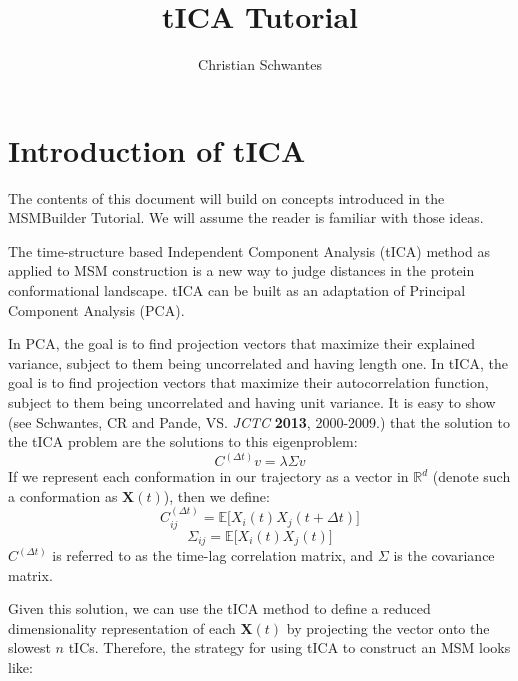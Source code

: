 \documentclass[12pt]{article}
\title
{tICA Tutorial}
\author{Christian Schwantes}
\begin{document}
\maketitle

\tableofcontents

\newpage
\section{Introduction of tICA}

The contents of this document will build on concepts introduced in the MSMBuilder Tutorial. We will assume the reader is familiar with those ideas.

The time-structure based Independent Component Analysis (tICA) method as applied to MSM construction is a new way to judge distances in the protein conformational landscape. tICA can be built as an adaptation of Principal Component Analysis (PCA).

In PCA, the goal is to find projection vectors that maximize their explained variance, subject to them being uncorrelated and having length one. In tICA, the goal is to find projection vectors that maximize their autocorrelation function, subject to them being uncorrelated and having unit variance. It is easy to show (see Schwantes, CR and Pande, VS. {\it JCTC} {\bf 2013}, 2000-2009.) that the solution to the tICA problem are the solutions to this eigenproblem:
$$ C^{(\Delta t)} v = \lambda \Sigma v $$ If we represent each conformation in our trajectory as a vector in $\mathbb{R}^d$ (denote such a conformation as $\mathbf{X}(t)$), then we define:
$$ C^{(\Delta t)}_{ij} = \mathbb{E}\Big[ X_i(t) X_j(t+\Delta t) \Big] $$
$$ \Sigma_{ij} = \mathbb{E}\Big[ X_i(t) X_j(t) \Big] $$ $C^{(\Delta t)}$ is referred to as the time-lag correlation matrix, and $\Sigma$ is the covariance matrix.

Given this solution, we can use the tICA method to define a reduced dimensionality representation of each $\mathbf{X}(t)$ by projecting the vector onto the slowest $n$ tICs. Therefore, the strategy for using tICA to construct an MSM looks like:
\end{document}
